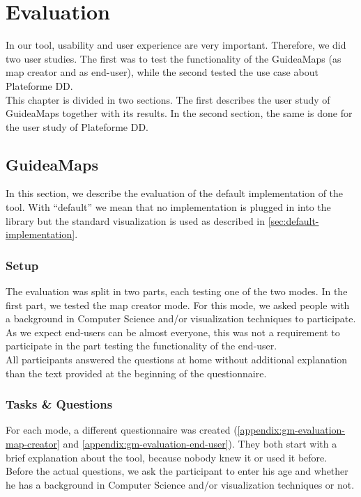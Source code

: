 \chapter{Evaluation}\label{ch:evaluation}
\color{blue}

In our tool, usability and user experience are very important. Therefore, we did two user studies. The first was to test the functionality of the GuideaMaps (as map creator and as end-user), while the second tested the use case about Plateforme DD.\\

This chapter is divided in two sections. The first describes the user study of GuideaMaps together with its results. In the second section, the same is done for the user study of Plateforme DD.





\section{GuideaMaps}
In this section, we describe the evaluation of the default implementation of the tool. With ``default'' we mean that no implementation is plugged in into the library but the standard visualization is used as described in \autoref{sec:default-implementation}.

\subsection{Setup}
The evaluation was split in two parts, each testing one of the two modes. In the first part, we tested the map creator mode. For this mode, we asked people with a background in Computer Science and/or visualization techniques to participate. As we expect end-users can be almost everyone, this was not a requirement to participate in the part testing the functionality of the end-user.\\

All participants answered the questions at home without additional explanation than the text provided at the beginning of the questionnaire.

\subsection{Tasks \& Questions}
For each mode, a different questionnaire was created (\autoref{appendix:gm-evaluation-map-creator} and \autoref{appendix:gm-evaluation-end-user}). They both start with a brief explanation about the tool, because nobody knew it or used it before. Before the actual questions, we ask the participant to enter his age and whether he has a background in Computer Science and/or visualization techniques or not.\\

